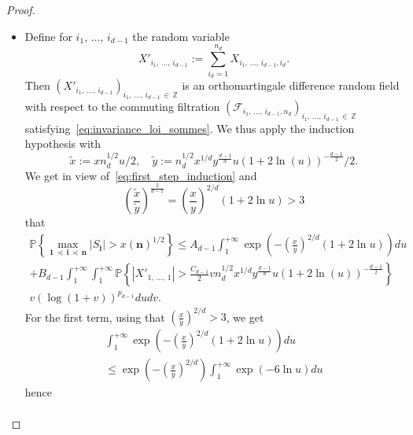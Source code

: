 \documentclass[10pt]{amsart}
\theoremstyle{definition}\newtheorem{defi}[theo]{Definition}\newtheorem{rema}[theo]{Remark}\newtheorem{exam}[theo]{Example}\newtheorem{exem}[theo]{Example}\newtheorem{nota}[theo]{Notation}
\newcommand{\Fca}{\mathcal{F}}
\newcommand\PP{\mathbb{P}}
\newcommand\Z{\mathbb{Z}}
\newcommand{\pr}[1]{(#1)}
\newcommand{\gr}[1]{\bm{#1}}
\newcommand{\gri}{\bm{i}}
\newcommand{\grn}{\bm{n}}
\newcommand{\imd}{\preccurlyeq}
\begin{document}
\begin{proof}
\begin{itemize}
\begin{multline}
\PP\left\{\max_{\gr{1}\,\imd\,\gri\,\imd\,\gr{n}} \left|S_{\gri} \right| >x\left|\grn\right|^{1/2}\right\} \\
\leq\int_1^{+\infty}
\PP\left\{
\max_{1\,\leq\,i_q\,\leq\,n_q,\,1\,\leq \,q\,\leq\,d-1}
\left|S_{i_1,\,\dots,\,i_{d-1},\,n_d}\right|>x\left|\grn\right|^{1/2}u/2 \right\}du.
\end{multline}
\item[\eqref{step2}] Define for $i_1,\,\dots,\,i_{d-1}$ the random variable
\begin{equation}
X'_{i_1,\,\dots,\,i_{d-1}}:=
\sum_{i_d=1}^{n_d}X_{i_1,\,\dots,\,i_{d-1},i_d}.
\end{equation}
Then $\pr{X'_{i_1,\,\dots,\,i_{d-1}}}_{i_1,\,\dots,\,i_{d-1}\,\in\,\Z}$ is an orthomartingale difference random field with respect to the commuting filtration $\pr{\Fca_{i_1,\,\dots,\,i_{d-1},n_d}}_{i_1,\,\dots,\,i_{d-1}\,\in\,\Z}$ satisfying~\eqref{eq:invariance_loi_sommes}. We thus apply the induction hypothesis with
\begin{equation}
\widetilde{x}:= xn_d^{1/2}u/2, \quad \widetilde{y}:= n_d^{1/2}x^{ 1/d}y^{\frac{d-1}d}u
\left(1+2\ln\pr{ u}\right)^{-\frac{d-1}2}/2.
\end{equation}
We get in view of~\eqref{eq:first_step_induction} and
\begin{equation}
\left(\frac{\widetilde{x}}{\widetilde{y}}\right)^{\frac{2}{d-1}}=
\left(\frac xy\right)^{2/d}\left(1+2\ln u\right)>3
\end{equation}
that
\begin{multline}\label{eq:second_step_induction}
\PP\left\{\max_{\gr{1}\,\imd\,\gri\,\imd\,\gr{n}} \left|S_{\gri}\right| >x\left(\grn\right)^{1/2}\right\} \leq A_{d-1}\int_1^{+\infty}\exp\left(-\left(\frac xy\right)^{2/d}\left(1+2\ln u\right)\right)du\\+ B_{d-1}\int_1^{+\infty}\int_1^{+\infty}\PP\left\{
\left|X'_{1,\,\dots,\,1}\right|>\frac{C_{d-1}}2vn_d^{1/2}x^{1/d}y^{\frac{d-1}d}u
\left(1+2\ln\pr{ u}\right)^{-\frac{d-1}2}\right\}\\
v\left(\log\pr{1+v}\right)^{p_{d-1}}dudv.
\end{multline}
For the first term, using that $ \pr{\frac xy}^{2/d}>3$, we get
\begin{multline}
\int_1^{+\infty}\exp\left(-\left(\frac xy\right)^{2/d}\left(1+2\ln u\right)\right)du
\\
\leq \exp\left(-\left(\frac xy\right)^{2/d}\right)
\int_1^{+\infty}\exp\left(-6\ln u\right)du
\end{multline}
hence
\begin{multline}\label{eq:second_step_induction_final}

\end{multline}
\end{itemize}
\end{proof}
\end{document}
